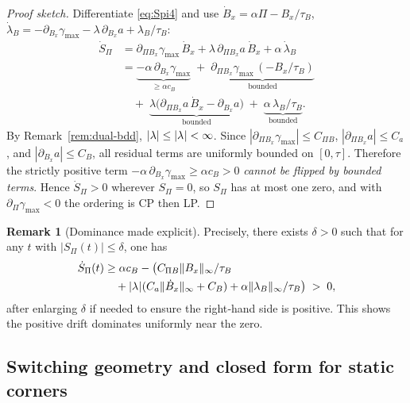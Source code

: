 \documentclass[aps,pre,twocolumn,showpacs,superscriptaddress]{revtex4-2}
\theoremstyle{definition}
\newtheorem{remark}[theorem]{Remark}
\begin{document}
\begin{proof}[Proof sketch]
Differentiate \eqref{eq:Spi4} and use $\dot B_x=\alpha\Pi-B_x/\tau_B$, $\dot\lambda_B=-\partial_{B_x}\gamma_{\max}-\lambda\,\partial_{B_x}a+\lambda_B/\tau_B$:
\begin{align*}
\dot S_\Pi 
&= \partial_{\Pi B_x}\gamma_{\max}\,\dot B_x + \lambda\,\partial_{\Pi B_x} a\,\dot B_x 
+ \alpha\,\dot\lambda_B \\
&= \underbrace{-\alpha\,\partial_{B_x}\gamma_{\max}}_{\ge \alpha c_B}
\;+\; \underbrace{\partial_{\Pi B_x}\gamma_{\max}\,(-B_x/\tau_B)}_{\text{bounded}} \\
&\quad+\; \underbrace{\lambda\big(\partial_{\Pi B_x} a\,\dot B_x - \partial_{B_x} a\big)}_{\text{bounded}}
\;+\; \underbrace{\alpha\,\lambda_B/\tau_B}_{\text{bounded}}.
\end{align*}
By Remark~\ref{rem:dual-bdd}, $|\lambda|\le |\lambda^{\*}|<\infty$. Since $|\partial_{\Pi B_x}\gamma_{\max}|\le C_{\Pi B}$, $|\partial_{\Pi B_x} a|\le C_a$, and $|\partial_{B_x} a|\le C_B$, all residual terms are uniformly bounded on $[0,\tau]$. Therefore the strictly positive term $-\alpha\,\partial_{B_x}\gamma_{\max}\ge \alpha c_B>0$ \emph{cannot be flipped by bounded terms}. Hence $\dot S_\Pi>0$ wherever $S_\Pi=0$, so $S_\Pi$ has at most one zero, and with $\partial_\Pi\gamma_{\max}<0$ the ordering is CP then LP.
\end{proof}

\begin{remark}[Dominance made explicit]
Precisely, there exists $\delta>0$ such that for any $t$ with $|S_\Pi(t)|\le\delta$, one has
\begin{align}
\dot S_\Pi(t) &\ge \alpha c_B - \big(C_{\Pi B}\|B_x\|_\infty/\tau_B\nonumber\\
&\quad + |\lambda^{\*}|(C_a\|\dot B_x\|_\infty + C_B) + \alpha\|\lambda_B\|_\infty/\tau_B\big) \;>\; 0,
\end{align}
after enlarging $\delta$ if needed to ensure the right‑hand side is positive. This shows the positive drift dominates uniformly near the zero.
\end{remark}

\subsection{Switching geometry and closed form for static corners}\label{subsec:geometry4}
\end{document}
